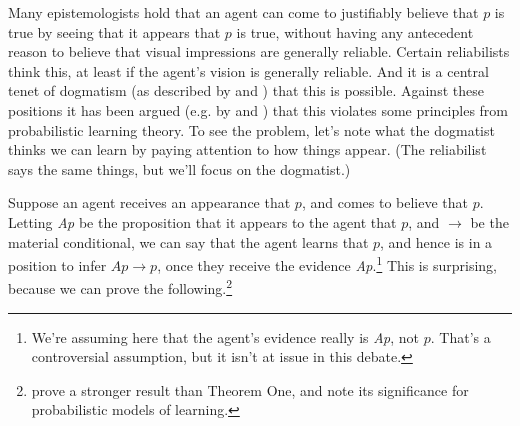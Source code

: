 \newcommand{\TheoremFive}{
\begin{quote}
\textbf{Theorem 5}
Let $Pr_1$ be a regular conditional $\vdash_{CL}$-probability function, and $Pr_2$ be a regular conditional $\vdash_{IL}$-probability function that is not a  $\vdash_{CL}$-probability function. And let $Pr_3$ be defined as in the text. (That is, $Pr_3(A) = xPr_1(A) + (1-x)Pr_2(A)$, and $Pr_3(A | B) = \frac{Pr_3(A \wedge B)}{Pr_3(B)}$.) Then $Pr_3$ is a regular conditional $\vdash_{IL}$-probability function.
\end{quote}
}

\newcommand{\TheoremSix}{
\begin{quote}
\textbf{Theorem 6}
Let \(x\) be any real in \((0, 1)\). Then there is a probability function \(Cr\) that (a) is a coherent credence function for someone whose credence that classical logic is correct is \(x\), and (b) satisfies each of the following inequalities:
\begin{align}
Pr(Ap \rightarrow p | Ap) &> Pr(Ap \rightarrow p) \\
Pr(\neg Ap \vee p | Ap) &> Pr(\neg Ap \vee p) \\
Pr(\neg(Ap \wedge \neg p) | Ap) &> Pr(\neg(Ap \wedge \neg p)) 
\end{align}
\end{quote}
}


\noindent Many epistemologists hold that an agent can come to justifiably believe that $p$ is true by seeing that it appears that $p$ is true, without having any antecedent reason to believe that visual impressions are generally reliable. Certain reliabilists think this, at least if the agent's vision is generally reliable. And it is a central tenet of dogmatism (as described by \citet{Pryor2000} and \citet{Pryor2004}) that this is possible. Against these positions it has been argued (e.g. by \citet{Cohen2005} and \citet{White2006}) that this violates some principles from probabilistic learning theory. To see the problem, let's note what the dogmatist thinks we can learn by paying attention to how things appear. (The reliabilist says the same things, but we'll focus on the dogmatist.)

Suppose an agent receives an appearance that $p$, and comes to believe that $p$. Letting \emph{Ap} be the proposition that it appears to the agent that $p$, and $\rightarrow$ be the material conditional, we can say that the agent learns that $p$, and hence is in a position to infer $Ap \rightarrow p$, once they receive the evidence \emph{Ap}.\footnote{We're assuming here that the agent's evidence really is \emph{Ap}, not $p$. That's a controversial assumption, but it isn't at issue in this debate.} This is surprising, because we can prove the following.\footnote{\citet{PopperMiller1987} prove a stronger result than Theorem One, and note its significance for probabilistic models of learning.}
	
